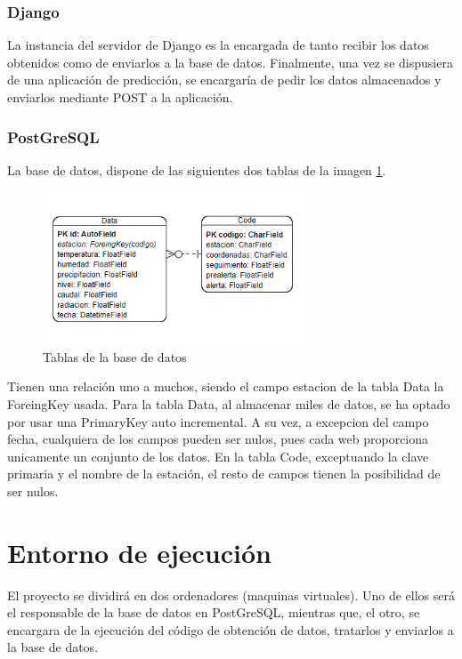 \subsubsection{Django}
La instancia del servidor de Django es la encargada de tanto recibir los datos obtenidos como de enviarlos a la base de datos. Finalmente, una vez se dispusiera de una aplicación de predicción, se encargaría de pedir los datos almacenados y enviarlos mediante POST a la aplicación.

\subsubsection{PostGreSQL}
La base de datos, dispone de las siguientes dos tablas de la imagen \ref{fig:ej33}.

\begin{figure} [H]
	\centering
	\includegraphics[width=0.7\textwidth]{fig/TablasBBDD.png}
	\caption[Tablas de la base de datos]{Tablas de la base de datos}
	\label{fig:ej33}
\end{figure}

Tienen una relación uno a muchos, siendo el campo estacion de la tabla Data la ForeingKey usada.\newline
\newline
Para la tabla Data, al almacenar miles de datos, se ha optado por usar una PrimaryKey auto incremental. A su vez, a excepcion del campo fecha, cualquiera de los campos pueden ser nulos, pues cada web proporciona unicamente un conjunto de los datos.\newline
\newline
En la tabla Code, exceptuando la clave primaria y el nombre de la estación, el resto de campos tienen la posibilidad de ser nulos.

\section{Entorno de ejecución}
El proyecto se dividirá en dos ordenadores (maquinas virtuales). Uno de ellos será el responsable de la base de datos en PostGreSQL, mientras que, el otro, se encargara de la ejecución del código de obtención de datos, tratarlos y enviarlos a la base de datos.

